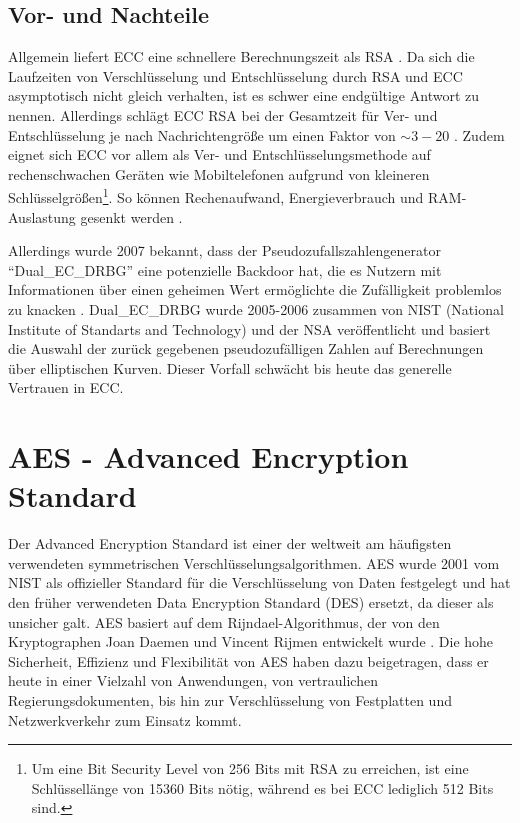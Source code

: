\documentclass[
	fontsize=11pt,
	headings=small,
	parskip=half,           %
	bibliography=totoc,
	numbers=noenddot,       %
	open=any,               %
]{scrreprt}
\begin{document}
\subsection{Vor- und Nachteile}
Allgemein liefert ECC eine schnellere Berechnungszeit als RSA \cite{ecc-mahto2018performance}. Da sich die Laufzeiten von Verschlüsselung und Entschlüsselung durch RSA und ECC asymptotisch nicht gleich verhalten, ist es schwer eine endgültige Antwort zu nennen. Allerdings schlägt ECC RSA bei der Gesamtzeit für Ver- und Entschlüsselung je nach Nachrichtengröße um einen Faktor von $\mathtt{\sim}3-20$ \cite{ecc-mahto2018performance, ecc-bao2022research}. Zudem eignet sich ECC vor allem als Ver- und Entschlüsselungsmethode auf rechenschwachen Geräten wie Mobiltelefonen aufgrund von kleineren Schlüsselgrößen\footnote{Um eine Bit Security Level von 256 Bits mit RSA zu erreichen, ist eine Schlüssellänge von 15360 Bits nötig, während es bei ECC lediglich 512 Bits sind.\cite{ecc-mahto2018performance}}. So können Rechenaufwand, Energieverbrauch und RAM-Auslastung gesenkt werden \cite{ecc-gupta2011ecc}.

Allerdings wurde 2007 bekannt, dass der Pseudozufallszahlengenerator ``Dual\_EC\_DRBG'' eine potenzielle Backdoor hat, die es Nutzern mit Informationen über einen geheimen Wert ermöglichte die Zufälligkeit problemlos zu knacken \cite{ecc-green2013backdoor}. Dual\_EC\_DRBG wurde 2005-2006 zusammen von NIST (National Institute of Standarts and Technology) und der NSA veröffentlicht und basiert die Auswahl der zurück gegebenen pseudozufälligen Zahlen auf Berechnungen über elliptischen Kurven. Dieser Vorfall schwächt bis heute das generelle Vertrauen in ECC. \cite{ecc-cloud2013elliptic}

\section{AES - Advanced Encryption Standard}
\label{sec:aes}
Der Advanced Encryption Standard ist einer der weltweit am häufigsten verwendeten symmetrischen Verschlüsselungsalgorithmen. AES wurde 2001 vom NIST als offizieller Standard für die Verschlüsselung von Daten festgelegt und hat den früher verwendeten Data Encryption Standard (DES) ersetzt, da dieser als unsicher galt. AES basiert auf dem Rijndael-Algorithmus, der von den Kryptographen Joan Daemen und Vincent Rijmen entwickelt wurde \cite{aes-jamil2004rijndael}. Die hohe Sicherheit, Effizienz und Flexibilität von AES haben dazu beigetragen, dass er heute in einer Vielzahl von Anwendungen, von vertraulichen Regierungsdokumenten, bis hin zur Verschlüsselung von Festplatten und Netzwerkverkehr zum Einsatz kommt.
\end{document}
